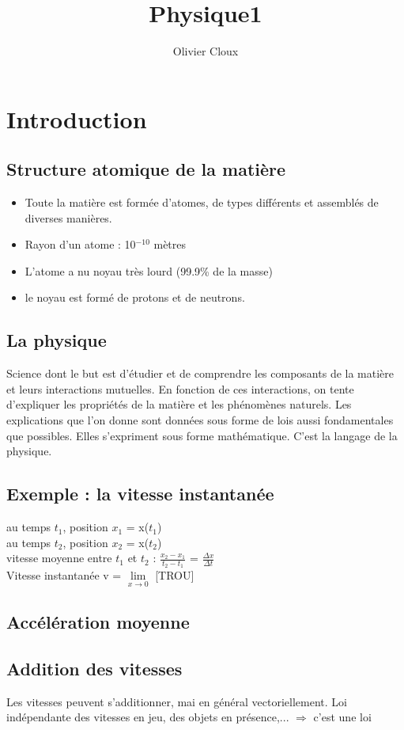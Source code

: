 \documentclass[12pt,a4paper]{article}
\author{Olivier Cloux}
\title{Physique1}
\begin{document}
\section{Introduction}
\subsection{Structure atomique de la matière}
\begin{itemize}
\item Toute la matière est formée d'atomes, de types différents et assemblés de diverses manières.
\item Rayon d'un atome : 10$^{-10}$ mètres
\item L'atome a nu noyau très lourd (99.9\% de la masse)
\item le noyau est formé de protons et de neutrons.
\end{itemize}
\subsection{La physique}
Science dont le but est d'étudier et de comprendre les composants de la matière et leurs interactions mutuelles. En fonction de ces interactions, on tente d'expliquer les propriétés de la matière et les phénomènes naturels. Les explications que l'on donne sont données sous forme de lois aussi fondamentales que possibles. Elles s'expriment sous forme mathématique. C'est la langage de la physique.
\subsection{Exemple : la vitesse instantanée}
au temps $t_1$, position $x_1$ = x($t_1$)
\\au temps $t_2$, position $x_2$ = x($t_2$)
\\ vitesse moyenne entre $t_1$ et $t_2$ : $\frac{x_2-x_1}{t_2-t_1}$ = $\frac{\Delta x}{\Delta t}$
\\ Vitesse instantanée v =     $\lim\limits_{x \to 0}$ [TROU]

\subsection{Accélération moyenne}
\subsection{Addition des vitesses}
Les vitesses peuvent s'additionner, mai en général vectoriellement. Loi indépendante des vitesses en jeu, des objets en présence,... $\Rightarrow$ c'est une loi
\end{document}
